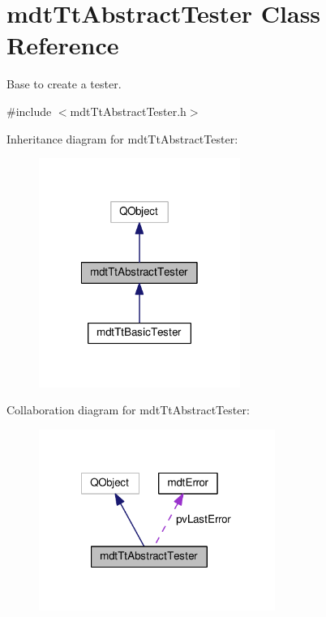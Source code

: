 \hypertarget{classmdt_tt_abstract_tester}{\section{mdt\-Tt\-Abstract\-Tester Class Reference}
\label{classmdt_tt_abstract_tester}
}


Base to create a tester.  




{\ttfamily \#include $<$mdt\-Tt\-Abstract\-Tester.\-h$>$}



Inheritance diagram for mdt\-Tt\-Abstract\-Tester\-:\nopagebreak
\begin{figure}[H]
\begin{center}
\leavevmode
\includegraphics[width=186pt]{classmdt_tt_abstract_tester__inherit__graph}
\end{center}
\end{figure}


Collaboration diagram for mdt\-Tt\-Abstract\-Tester\-:\nopagebreak
\begin{figure}[H]
\begin{center}
\leavevmode
\includegraphics[width=218pt]{classmdt_tt_abstract_tester__coll__graph}
\end{center}
\end{figure}
